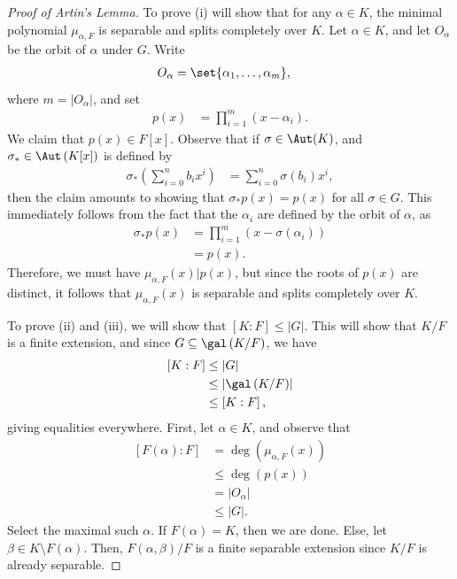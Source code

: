 \documentclass[10pt]{mypackage}
\begin{document}
\begin{proof}[Proof of Artin's Lemma]
  To prove (i) will show that for any $\alpha\in K$, the minimal polynomial $\mu_{\alpha,F}$ is separable and splits completely over $K$. Let $\alpha\in K$, and let $O_{\alpha}$ be the orbit of $\alpha$ under $G$. Write
    \begin{align*}
      O_{\alpha} &= \set{\alpha_1,\dots,\alpha_m},
    \end{align*}
    where $m = \left\vert O_{\alpha} \right\vert$, and set
    \begin{align*}
      p(x) &= \prod_{i=1}^{m}\left( x-\alpha_i \right).
    \end{align*}
    We claim that $p(x)\in F[x]$. Observe that if $\sigma\in \Aut(K)$, and $\sigma_{\ast}\in \Aut\left( K[x] \right)$ is defined by
    \begin{align*}
      \sigma_{\ast}\left( \sum_{i=0}^{n}b_ix^{i} \right) &= \sum_{i=0}^{n} \sigma\left( b_i \right)x^{i},
    \end{align*}
    then the claim amounts to showing that $\sigma_{\ast}p(x) = p(x)$ for all $\sigma\in G$. This immediately follows from the fact that the $\alpha_i$ are defined by the orbit of $\alpha$, as
    \begin{align*}
      \sigma_{\ast}p(x) &= \prod_{i=1}^{m}\left( x-\sigma\left( \alpha_i \right) \right)\\
                        &= p(x).
    \end{align*}
    Therefore, we must have $\mu_{\alpha,F}(x) | p(x)$, but since the roots of $p(x)$ are distinct, it follows that $\mu_{\alpha,F}(x)$ is separable and splits completely over $K$.

    To prove (ii) and (iii), we will show that $\left[ K:F \right]\leq \left\vert G \right\vert$. This will show that $K/F$ is a finite extension, and since $G\subseteq \gal\left( K/F \right)$, we have
      \begin{align*}
        \left[ K:F  \right] &\leq \left\vert G \right\vert\\
                            &\leq \left\vert \gal\left( K/F \right) \right\vert\\
                            &\leq \left[ K:F \right],
      \end{align*}
      giving equalities everywhere. First, let $\alpha\in K$, and observe that
      \begin{align*}
        \left[ F\left( \alpha \right):F \right] &= \deg\left( \mu_{\alpha,F}(x) \right)\\
                                                &\leq \deg\left( p(x) \right)\\
                                                &= \left\vert O_{\alpha} \right\vert\\
                                                &\leq \left\vert G \right\vert.
      \end{align*}
      Select the maximal such $\alpha$. If $F\left( \alpha \right) = K$, then we are done. Else, let $\beta\in K\setminus F\left( \alpha \right)$. Then, $F\left( \alpha,\beta \right)/F$ is a finite separable extension since $K/F$ is already separable.


\end{proof}
\end{document}
